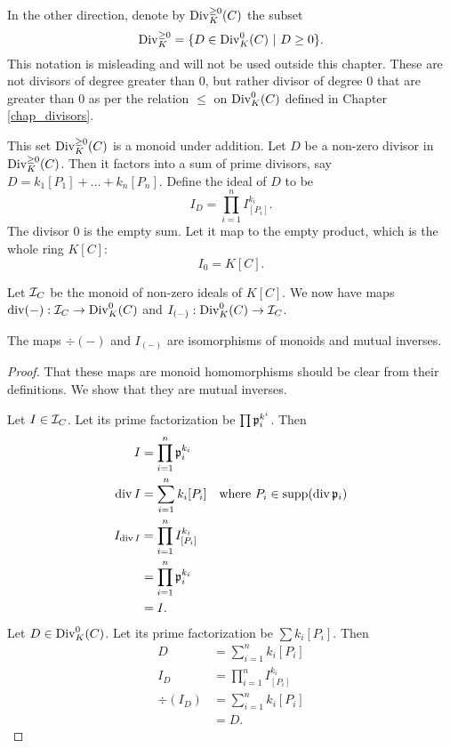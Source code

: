 In the other direction, denote by $\Div_K^{\geq 0}(C)$ the subset
  \[ \Div_K^{\geq 0} = \{ D \in \Div_K^0(C) ~|~ D \geq 0 \}. \]
This notation is misleading and will not be used outside this chapter.
These are not divisors of degree greater than 0, but rather divisor of degree 0 that are greater than 0
as per the relation $\leq$ on $\Div_K^0(C)$ defined in Chapter \ref{chap_divisors}.

This set $\Div_K^{\geq 0}(C)$ is a monoid under addition.
Let $D$ be a non-zero divisor in $\Div_K^{\geq 0}(C)$.
Then it factors into a sum of prime divisors, say $D = k_1[P_1] + \dots + k_n[P_n]$.
Define the ideal of $D$ to be
\[ I_D = \prod_{i=1}^n I_{[P_i]}^{k_i}. \]
The divisor 0 is the empty sum.
Let it map to the empty product, which is the whole ring $K[C]$:
\[ I_{0} = K[C]. \]

Let $\cal I_C$ be the monoid of non-zero ideals of $K[C]$.
We now have maps $\div(-) : \cal I_C \to \Div_K^0(C)$ and $I_{(-)} : \Div_K^0(C) \to \cal I_C$.
\begin{theorem}
  The maps $\div(-)$ and $I_{(-)}$ are isomorphisms of monoids and mutual inverses.
\end{theorem}
\begin{proof}
  That these maps are monoid homomorphisms should be clear from their definitions.
  We show that they are mutual inverses.

  Let $I \in \cal I_C$. Let its prime factorization be $\prod \frak p_i^{k^i}$. Then
  \begin{align*}
    I &= \prod_{i=1}^n \frak p_i^{k_i} \\
    \div I &= \sum_{i=1}^n k_i[P_i]
      & \text{where }P_i \in \supp(\div \frak p_i) \\
    I_{\div I} &= \prod_{i=1}^n I_{[P_i]}^{k_i} \\
               &= \prod_{i=1}^n \frak p_i^{k_i} \\
               &= I.
  \end{align*}
  Let $D \in \Div_K^0(C)$. Let its prime factorization be $\sum k_i[P_i]$. Then
  \begin{align*}
    D &= \sum_{i=1}^n k_i[P_i] \\
    I_D &= \prod_{i=1}^n I_{[P_i]}^{k_i} \\
    \div(I_D) &= \sum_{i=1}^n k_i [P_i] \\ &= D.
  \end{align*}
\end{proof}
